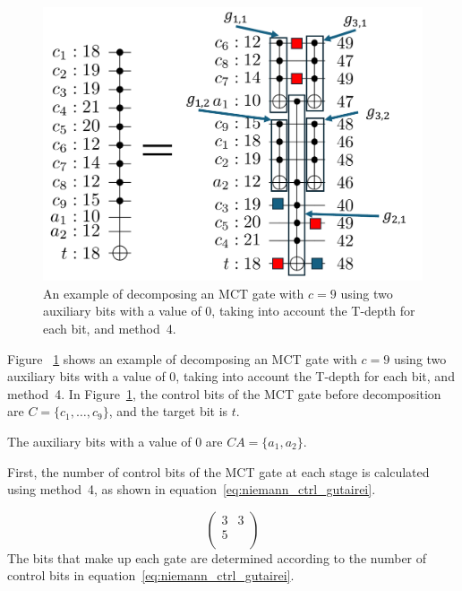 \par
\begin{figure}

\centering

\includegraphics[width=0.95\linewidth]{img/niemann_proposed.pdf}

\caption{An example of decomposing an MCT gate with $c=9$ using two auxiliary bits with a value of 0,
taking into account the T-depth for each bit, and method~4.}

\label{niemann_proposed}

\end{figure}

Figure ~\ref{niemann_proposed} shows an example of decomposing an MCT gate with $c=9$ using two auxiliary bits with a value of 0,
taking into account the T-depth for each bit, and method~4.
In Figure~\ref{niemann_proposed},
the control bits of the MCT gate before decomposition are $C=\{c_{1},\dots, c_{9}\}$, and the target bit is $t$.

The auxiliary bits with a value of 0 are $CA=\{a_{1}, a_{2}\}$.

First, the number of control bits of the MCT gate at each stage is calculated using method~4, as shown in equation~\ref{eq:niemann_ctrl_gutairei}.

\begin{equation}\label{eq:niemann_ctrl_gutairei}
\begin{pmatrix}

3 & 3 \\

5 & \\
\end{pmatrix}
\end{equation}
The bits that make up each gate are determined according to the number of control bits in equation~\ref{eq:niemann_ctrl_gutairei}.

